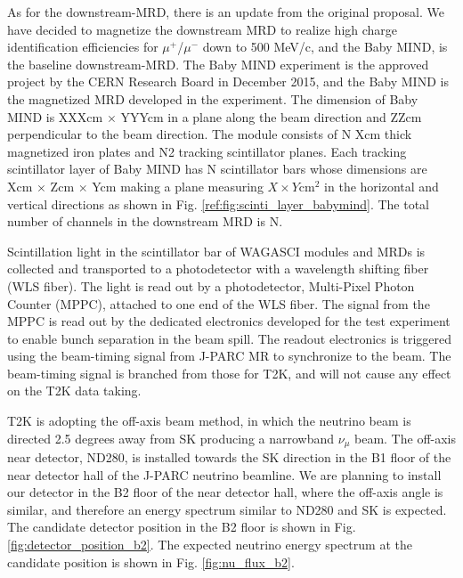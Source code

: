 As for the downstream-MRD, there is an update from the original proposal.
We have decided to magnetize the downstream MRD to realize high charge identification efficiencies for $\mu^{+}$/$\mu^{-}$ down to 500 MeV/c,
and the Baby MIND\cite{BabyMIND}, is the baseline downstream-MRD.
The Baby MIND experiment is the approved project by the CERN Research Board in December 2015,
and the Baby MIND is the magnetized MRD developed in the experiment.
The dimension of Baby MIND is XXXcm $\times$ YYYcm 
in a plane along the beam direction and ZZcm perpendicular to the beam direction.
The module consists of N Xcm thick magnetized iron plates and N2 tracking scintillator planes.
Each tracking scintillator layer of Baby MIND has N scintillator bars whose dimensions are
Xcm $\times$ Zcm $\times$ Ycm making a plane measuring $X \times Y$cm$^{2}$
in the horizontal and vertical directions as shown in Fig. \ref{ref:fig:scinti_layer_babymind}.
The total number of channels in the downstream MRD is N.


Scintillation light in the scintillator bar of WAGASCI modules and MRDs is collected and transported to a photodetector with a wavelength shifting fiber (WLS fiber).
The light is read out by a photodetector, Multi-Pixel Photon Counter (MPPC), attached to one end of the 
WLS fiber.
The signal from the MPPC is read out by the dedicated electronics developed for the test experiment
to enable bunch separation in the beam spill.
The readout electronics is triggered using the beam-timing signal from J-PARC MR to synchronize to the beam.
The beam-timing signal is branched from those for T2K, and will not cause any effect on the T2K data taking.


T2K is adopting the off-axis beam method, in which the neutrino beam is directed 2.5 degrees
away from SK producing a narrowband $\nu_{\mu}$ beam.
The off-axis near detector, ND280, is installed towards the SK direction in the B1 floor of the near detector hall of the J-PARC neutrino beamline.
We are planning to install our detector in the B2 floor of the near detector hall,
where the off-axis angle is similar, and therefore an energy spectrum similar to ND280 and SK is expected.
The candidate detector position in the B2 floor is shown in Fig. \ref{fig:detector_position_b2}.
The expected neutrino energy spectrum at the candidate position is shown in Fig. \ref{fig:nu_flux_b2}.


